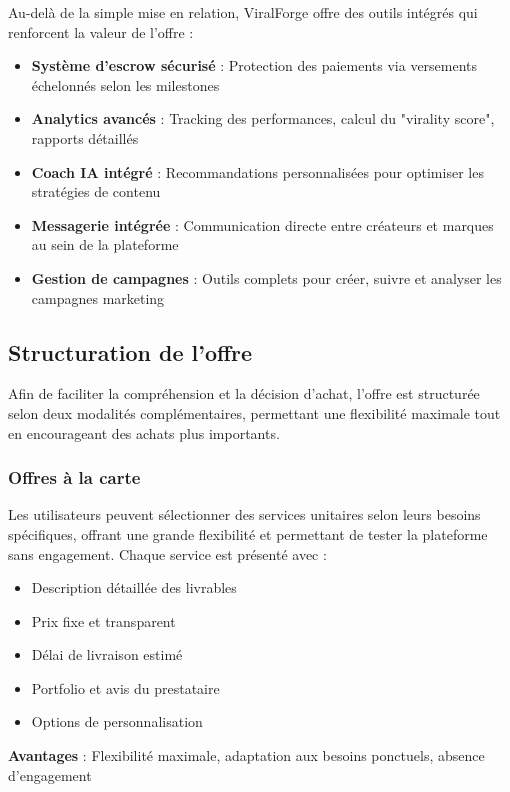 Au-delà de la simple mise en relation, ViralForge offre des outils intégrés qui renforcent la valeur de l'offre :

\begin{itemize}
    \item \textbf{Système d'escrow sécurisé} : Protection des paiements via versements échelonnés selon les milestones
    \item \textbf{Analytics avancés} : Tracking des performances, calcul du "virality score", rapports détaillés
    \item \textbf{Coach IA intégré} : Recommandations personnalisées pour optimiser les stratégies de contenu
    \item \textbf{Messagerie intégrée} : Communication directe entre créateurs et marques au sein de la plateforme
    \item \textbf{Gestion de campagnes} : Outils complets pour créer, suivre et analyser les campagnes marketing
\end{itemize}

\subsection{Structuration de l'offre}

Afin de faciliter la compréhension et la décision d'achat, l'offre est structurée selon deux modalités complémentaires, permettant une flexibilité maximale tout en encourageant des achats plus importants.

\subsubsection{Offres à la carte}

Les utilisateurs peuvent sélectionner des services unitaires selon leurs besoins spécifiques, offrant une grande flexibilité et permettant de tester la plateforme sans engagement. Chaque service est présenté avec :
\begin{itemize}
    \item Description détaillée des livrables
    \item Prix fixe et transparent
    \item Délai de livraison estimé
    \item Portfolio et avis du prestataire
    \item Options de personnalisation
\end{itemize}

\textbf{Avantages} : Flexibilité maximale, adaptation aux besoins ponctuels, absence d'engagement

